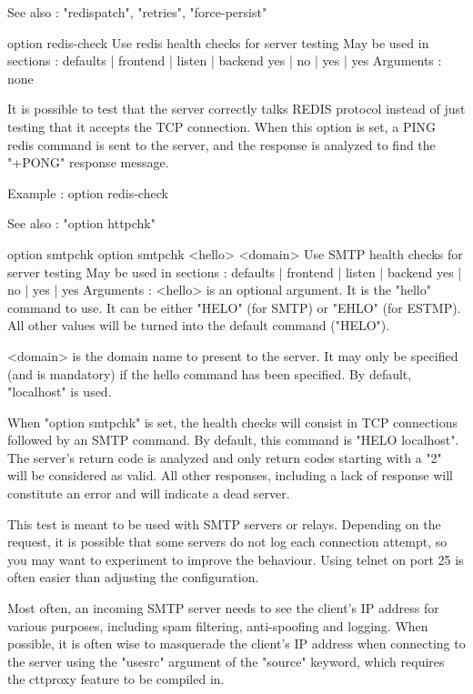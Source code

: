   See also : "redispatch", "retries", "force-persist"


option redis-check
  Use redis health checks for server testing
  May be used in sections :   defaults | frontend | listen | backend
                                 yes   |    no    |   yes  |   yes
  Arguments : none

  It is possible to test that the server correctly talks REDIS protocol instead
  of just testing that it accepts the TCP connection. When this option is set,
  a PING redis command is sent to the server, and the response is analyzed to
  find the "+PONG" response message.

  Example :
        option redis-check

  See also : "option httpchk"


option smtpchk
option smtpchk <hello> <domain>
  Use SMTP health checks for server testing
  May be used in sections :   defaults | frontend | listen | backend
                                 yes   |    no    |   yes  |   yes
  Arguments :
    <hello>   is an optional argument. It is the "hello" command to use. It can
              be either "HELO" (for SMTP) or "EHLO" (for ESTMP). All other
              values will be turned into the default command ("HELO").

    <domain>  is the domain name to present to the server. It may only be
              specified (and is mandatory) if the hello command has been
              specified. By default, "localhost" is used.

  When "option smtpchk" is set, the health checks will consist in TCP
  connections followed by an SMTP command. By default, this command is
  "HELO localhost". The server's return code is analyzed and only return codes
  starting with a "2" will be considered as valid. All other responses,
  including a lack of response will constitute an error and will indicate a
  dead server.

  This test is meant to be used with SMTP servers or relays. Depending on the
  request, it is possible that some servers do not log each connection attempt,
  so you may want to experiment to improve the behaviour. Using telnet on port
  25 is often easier than adjusting the configuration.

  Most often, an incoming SMTP server needs to see the client's IP address for
  various purposes, including spam filtering, anti-spoofing and logging. When
  possible, it is often wise to masquerade the client's IP address when
  connecting to the server using the "usesrc" argument of the "source" keyword,
  which requires the cttproxy feature to be compiled in.

